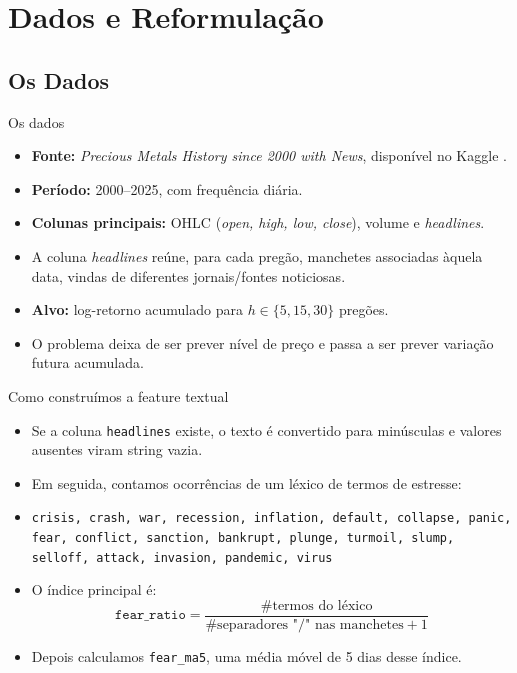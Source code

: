 \documentclass{libs/ufc_format}
\begin{document}
\section{Dados e Reformulação}
\subsection{Os Dados}

\begin{frame}{Os dados}
    \begin{itemize}
        \item \textbf{Fonte:} \emph{Precious Metals History since 2000 with News}, disponível no Kaggle \cite{kaggle_precious_metals}.
        \item \textbf{Período:} 2000--2025, com frequência diária.
        \item \textbf{Colunas principais:} OHLC (\emph{open, high, low, close}), volume e \emph{headlines}.
        \item A coluna \emph{headlines} reúne, para cada pregão, manchetes associadas àquela data, vindas de diferentes jornais/fontes noticiosas.
        \item \textbf{Alvo:} log-retorno acumulado para $h \in \{5, 15, 30\}$ pregões.
        \item O problema deixa de ser prever nível de preço e passa a ser prever variação futura acumulada.
    \end{itemize}
\end{frame}

{\logo{}
\begin{frame}{Como construímos a feature textual}
    \begin{itemize}
        \item Se a coluna \texttt{headlines} existe, o texto é convertido para minúsculas e valores ausentes viram string vazia.
        \item Em seguida, contamos ocorrências de um léxico de termos de estresse:
        \item \scriptsize \texttt{crisis, crash, war, recession, inflation, default, collapse, panic, fear, conflict, sanction, bankrupt, plunge, turmoil, slump, selloff, attack, invasion, pandemic, virus}
        \normalsize
        \item O índice principal é:
        \[
            \texttt{fear\_ratio}
            =
            \frac{\#\text{termos do léxico}}{\#\text{separadores "/" nas manchetes} + 1}
        \]
        \item Depois calculamos \texttt{fear\_ma5}, uma média móvel de 5 dias desse índice.
    \end{itemize}

    \vspace{0.2cm}
\end{frame}
}
\end{document}
